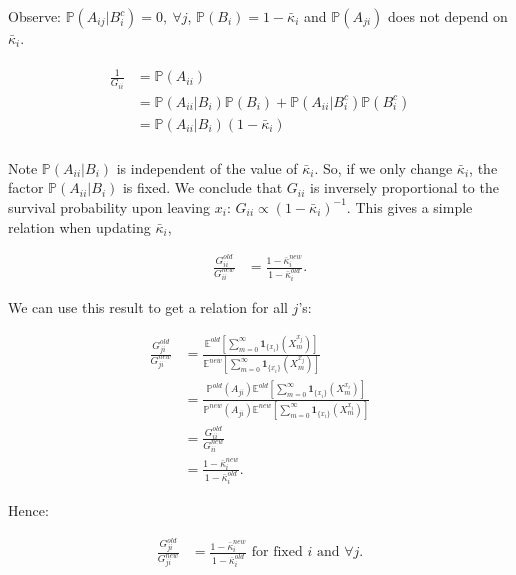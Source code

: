 \documentclass[paper=a4, fontsize=11pt]{scrartcl} %
\numberwithin{equation}{section} %
\numberwithin{figure}{section} %
\numberwithin{table}{section} %
\begin{document}
Observe: $\mathbb{P}(A_{ij}|B^{c}_i ) = 0,\ \forall j$, $\mathbb{P}(B_i) = 1-\bar{\kappa}_{i}$
and $\mathbb{P}(A_{ji})$ does not depend on $\bar{\kappa}_{i}$.

\begin{align}\label{eq1}
  \begin{split}
  \frac{1}{G_{ii}} &= \mathbb{P}( A_{ii} ) \\
  &= \mathbb{P}( A_{ii} | B_i) \mathbb{P}(B_i ) +  \mathbb{P}( A_{ii} | B^{c}_i) \mathbb{P}(B^{c}_i ) \\ 
  &=  \mathbb{P}( A_{ii}|B_i ) (1- \bar{\kappa}_i) \\
  \end{split}
\end{align}

Note $\mathbb{P}(A_{ii} |B_i )$ is independent of the value of $\bar{\kappa}_i$.
So, if we only change $\bar{\kappa}_i$, the factor $\mathbb{P}(A_{ii}|B_i)$ is fixed.
We conclude that $G_{ii}$ is inversely proportional
to the survival probability upon leaving $x_i$: $G_{ii} \propto (1-\bar{\kappa}_i)^{-1}$.
This gives a simple relation when updating $\bar{\kappa}_i$,

\begin{align*}
\frac{G^{old}_{ii}}{G^{new}_{ii}} &= \frac{ 1 - \bar{\kappa}^{new}_i }{ 1 - \bar{\kappa}^{old}_i}.
\end{align*}

We can use this result to get a relation for all $j$'s:

\begin{align*}
  \frac{G^{old}_{ji}}{G^{new}_{ji}} &= \frac{ \mathbb{E}^{old} [ \sum_{m=0}^{\infty} \mathbf{1}_{ \{x_i\} }( X^{x_j}_m)] }
    { \mathbb{E}^{new} [ \sum_{m=0}^{\infty} \mathbf{1}_{ \{x_i\} }( X^{x_j}_m)] } \\
    &=  \frac{\mathbb{P}^{old}(A_{ji}) \mathbb{E}^{old} [ \sum_{m=0}^{\infty} \mathbf{1}_{ \{x_i\} }( X^{x_i}_m)] }
    { \mathbb{P}^{new}(A_{ji})\mathbb{E}^{new} [ \sum_{m=0}^{\infty} \mathbf{1}_{ \{x_i\} }( X^{x_i}_m)] } \\
    &=\frac{G_{ii}^{old}}{G_{ii}^{new}} \\
    &= \frac{ 1 - \bar{\kappa}^{new}_i }{ 1 - \bar{\kappa}^{old}_i}.
\end{align*}

Hence:

\begin{align}\label{relation}
\frac{G^{old}_{ji}}{G^{new}_{ji}} &= \frac{ 1 - \bar{\kappa}^{new}_i }{ 1 - \bar{\kappa}^{old}_i} \text{ for fixed $i$ and $\forall j$.}
\end{align}
\end{document}
